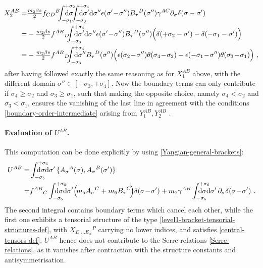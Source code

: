 \documentclass[12pt]{article}
\numberwithin{equation}{section}
\begin{document}
\begin{equation}\label{vanishing-X2AB}
\begin{aligned}
\!X_{2}^{AB}=&\tfrac{m_{2}\beta s}{2}f_{CD}{}^{B}\!\!\!\int_{-\sigma_{1}}^{+\sigma_{2}}\!\!\!\!\!\!\!\!\!\!\mathrm{d}\sigma \!\! \int_{-\sigma_{3}}^{+\sigma_{4}}\!\!\!\!\!\!\!\!\!\!\mathrm{d}\sigma'\mathrm{d}\sigma''  \epsilon(\sigma'\!-\!\sigma'') B_{\tau}{}^{D}(\sigma'')\gamma^{AC}\partial_{\sigma}\delta(\sigma-\sigma')
\\
=&-\tfrac{m_{2}\beta s}{2}f^{AB}{}_{D}\!\!\!\int_{-\sigma_{3}}^{+\sigma_{4}}\!\!\!\!\!\!\!\!\!\!\mathrm{d}\sigma'\mathrm{d}\sigma''  \epsilon(\sigma'\!-\!\sigma'') B_{\tau}{}^{D}(\sigma'')\Bigl(\delta(+\sigma_{2}-\sigma')-\delta(-\sigma_{1}-\sigma')\Bigr)
\\
=&-\tfrac{m_{2}\beta s}{2}f^{AB}{}_{D}\!\!\!\int_{-\sigma_{3}}^{+\sigma_{4}}\!\!\!\!\!\!\!\!\!\!\mathrm{d}\sigma'' B_{\tau}{}^{D}(\sigma'')\Bigl(\epsilon(\sigma_{2}\!-\!\sigma'')\theta(\sigma_{4}\!-\!\sigma_{2})-\epsilon(-\sigma_{1}\!-\!\sigma'')\theta(\sigma_{3}\!-\!\sigma_{1})\Bigr) \,\, ,
\end{aligned}
\end{equation}
after having followed exactly the same reasoning as for $X_{1}^{AB}$ above, with the different domain $\sigma'' \in [-\sigma_{3},+\sigma_{4}]$. Now the boundary terms can only contribute if $\sigma_{4}\geq \sigma_{2}$ and $\sigma_{3}\geq \sigma_{1}$, such that making the opposite choice, namely $\sigma_{4}<\sigma_{2}$ and $\sigma_{3}<\sigma_{1}$, ensures the vanishing of the last line in agreement with the conditions \eqref{boundary-order-intermediate} arising from $Y_{1}^{AB},Y_{2}^{AB}$ .

\paragraph{Evaluation of $U^{AB}$.} This computation can be done explicitly by using \eqref{Yangian-general-brackets}:
\begin{align}\label{UAB}
U^{AB}=&\int_{-\sigma_{5}}^{+\sigma_{6}}\!\!\!\!\!\!\!\!\!\!\!\mathrm{d}\sigma\mathrm{d}\sigma' \, \{ A_{\sigma}{}^{A}(\sigma),A_{\sigma}{}^{B}(\sigma') \}
\\
=&  f^{AB}{}_{C}\int_{-\sigma_{5}}^{+\sigma_{6}}\!\!\!\!\!\!\!\!\!\!\!\mathrm{d}\sigma\mathrm{d}\sigma' \Bigl(\!m_{5}A_{\sigma}{}^{C}+m_{6}B_{\tau}{}^{C}\!\Bigr)\delta(\sigma\!-\!\sigma')
+m_{7}\gamma^{AB}\int_{-\sigma_{5}}^{+\sigma_{6}}\!\!\!\!\!\!\!\!\!\!\!\mathrm{d}\sigma\mathrm{d}\sigma' \, \partial_{\sigma}\delta(\sigma\!-\!\sigma') \,\, .
\notag 
\end{align}
The second integral contains boundary terms which cancel each other, while the first one exhibits a tensorial structure of the type \eqref{level1-bracket-tensorial-structures-def}, with $X_{E_{1}...E_{N}}{}^{P}$ carrying no lower indices, and satisfies \eqref{central-tensors-def}. $U^{AB}$ hence does not contribute to the Serre relations \eqref{Serre-relations}, as it vanishes after contraction with the structure constants and antisymmetrisation.
\end{document}
